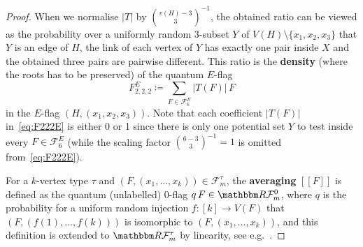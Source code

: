 \documentclass[11pt,a4paper]{article}
\theoremstyle{remark}
\newcommand{\C}[1]{\mathcal{#1}}
\newcommand{\I}[1]{{\mathbbm #1}}
\newcommand{\eval}[1]{[\![#1]\!]}
\newcommand{\e}{\varepsilon}
\newcommand{\hide}[1]{}
\begin{document}
\begin{proof}
When we normalise $|T|$ by ${v(H)-3\choose 3}^{-1}$, the obtained ratio can be viewed as the probability over a uniformly random $3$-subset $Y$ of $V(H)\setminus\{x_1,x_2,x_3\}$  that $Y$ is an edge of $H$, the link of each vertex of $Y$ has exactly one pair inside $X$ and the obtained three pairs are pairwise different.
This ratio is the \textbf{density}  (where the roots has to be preserved) of the quantum $E$-flag
\begin{equation}\label{eq:F222E}
	F_{2,2,2}^E\coloneqq \sum_{F\in \C F_6^E} |T(F)|\,  F
\end{equation}
in the $E$-flag $(H,(x_1,x_2,x_3))$.
 Note that each coefficient $|T(F)|$ in~\eqref{eq:F222E} is either 0 or 1 since there is only one potential set $Y$ to test inside every $F\in\C F_6^E$ (while the scaling factor ${6-3\choose 3}^{-1}=1$ is omitted from~\eqref{eq:F222E}).

For a $k$-vertex type $\tau$ and $(F,(x_1,\dots,x_k))\in\C F_m^\tau$,  the \textbf{averaging} $\eval{F}$ is defined as the quantum (unlabelled) $0$-flag $q\, F\in\I R\C F_m^0$, where $q$ is the probability for a uniform random injection $f:[k]\to V(F)$ that $(F,(f(1),\dots,f(k)))$ is isomorphic to $(F,(x_1,\dots,x_k))$, and this definition is extended to $\I R\C F_m^\tau$ by linearity, see e.g.\ \cite[Section 2.2]{Raz07}.


\hide{
Let us return to the lemma. Suppose that some $\e>0$ contradicts it. Then there is a  sequence of counterexamples $\C H$ of order $n\to\infty$. By passing to a subsequence, we can assume that they converge to a flag algebra limit object, which is a positive algebra homomorphism $\phi:\C A^0\to\I R$. The min-degree assumption translates in the statement that the random homomorphism $\boldsymbol{\phi}^1:\C A^1\to\I R$ is at least $\frac14-10^{-6}$ with probability 1. We also add the extra assumption that the edge density is at most $\frac{25073}{100000}$, coming from Proposition~\ref{pr:Flag-raw-upper-bound} applied to each $3$-graph $\C H$. We deal with these assumptions in the standard way: each can be  multiplied by an (unknown) non-negative combination of flags of the same type and the result is averaged and added to the final identity.}


\end{proof}
\end{document}
